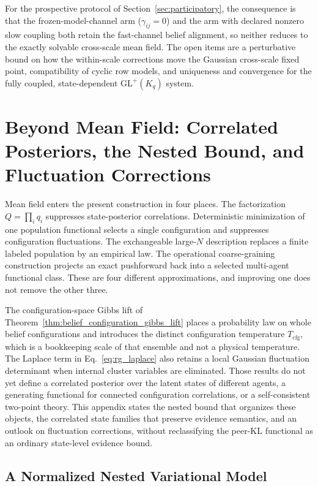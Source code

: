 For the prospective protocol of Section~\ref{sec:participatory}, the consequence is that the frozen-model-channel arm ($\gamma_{ij}=0$) and the arm with declared nonzero slow coupling both retain the fast-channel belief alignment, so neither reduces to the exactly solvable cross-scale mean field. The open items are a perturbative bound on how the within-scale corrections move the Gaussian cross-scale fixed point, compatibility of cyclic row models, and uniqueness and convergence for the fully coupled, state-dependent $\mathrm{GL}^+(K_q)$ system.

\section{Beyond Mean Field: Correlated Posteriors, the Nested Bound, and Fluctuation Corrections}
\label{sec:beyond_mean_field_gauge_vfe}

Mean field enters the present construction in four places. The factorization $Q=\prod_i q_i$ suppresses state-posterior correlations. Deterministic minimization of one population functional selects a single configuration and suppresses configuration fluctuations. The exchangeable large-$N$ description replaces a finite labeled population by an empirical law. The operational coarse-graining construction projects an exact pushforward back into a selected multi-agent functional class. These are four different approximations, and improving one does not remove the other three.

The configuration-space Gibbs lift of Theorem~\ref{thm:belief_configuration_gibbs_lift} places a probability law on whole belief configurations and introduces the distinct configuration temperature $T_{\mathrm{cfg}}$, which is a bookkeeping scale of that ensemble and not a physical temperature. The Laplace term in Eq.~\eqref{eq:rg_laplace} also retains a local Gaussian fluctuation determinant when internal cluster variables are eliminated. Those results do not yet define a correlated posterior over the latent states of different agents, a generating functional for connected configuration correlations, or a self-consistent two-point theory. This appendix states the nested bound that organizes these objects, the correlated state families that preserve evidence semantics, and an outlook on fluctuation corrections, without reclassifying the peer-KL functional as an ordinary state-level evidence bound.

\subsection{A Normalized Nested Variational Model}

